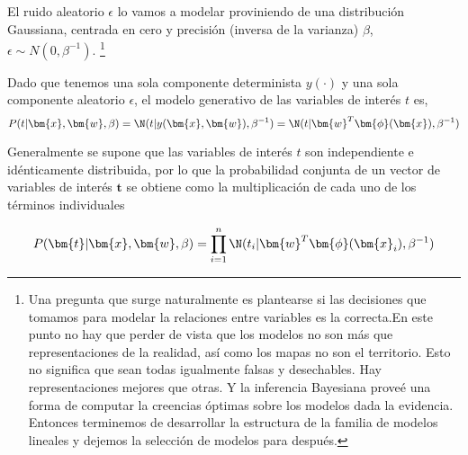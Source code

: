 \documentclass[a4paper,10pt]{article}
\begin{document}
El ruido aleatorio $\epsilon$ lo vamos a modelar proviniendo de una distribuci\'on Gaussiana, centrada en cero y precisi\'on (inversa de la varianza) $\beta$, $\epsilon \sim N(0,\beta^{-1})$.
\footnote{Una pregunta que surge naturalmente es plantearse si las decisiones que tomamos para modelar la relaciones entre variables es la correcta.En este punto no hay que perder de vista que los modelos no son m\'as que representaciones de la realidad, as\'i como los mapas no son el territorio.
Esto no significa que sean todas igualmente falsas y desechables.
Hay representaciones mejores que otras.
Y la inferencia Bayesiana prove\'e una forma de computar la creencias \'optimas sobre los modelos dada la evidencia.
Entonces terminemos de desarrollar la estructura de la familia de modelos lineales y dejemos la selecci\'on de modelos para despu\'es.}

Dado que tenemos una sola componente determinista $y(\cdot)$ y una sola componente aleatorio $\epsilon$, el modelo generativo de las variables de inter\'es $t$ es,
\begin{equation}
P(t | \bm{x}, \bm{w}, \beta) = \N(t | y(\bm{x},\bm{w}), \beta^{-1}) = \N(t | \bm{w}^T \bm{\phi}(\bm{x}) , \beta^{-1})
\end{equation}

% 
% 
%     
%     
%       
% 

Generalmente se supone que las variables de inter\'es $t$ son independiente e id\'enticamente distribuida, por lo que la probabilidad conjunta de un vector de variables de inter\'es $\bm{t}$ se obtiene como la multiplicaci\'on de cada uno de los t\'erminos individuales

\begin{equation}
P(\bm{t} | \bm{x}, \bm{w}, \beta) = \prod_{i=1}^n \N(t_i | \bm{w}^T \bm{\phi}(\bm{x}_i) , \beta^{-1})
\end{equation}
\end{document}
